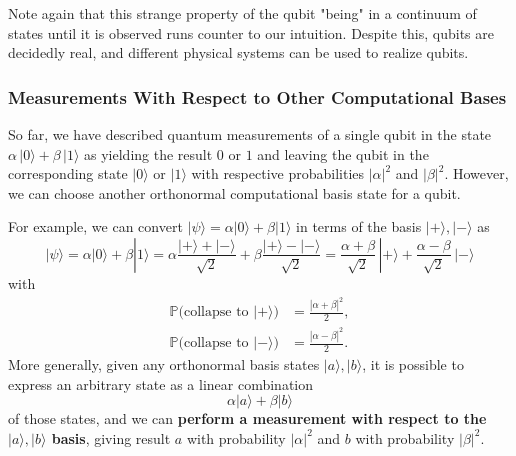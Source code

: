 \documentclass{article}
\theoremstyle{definition}
\begin{document}
Note again that this strange property of the qubit "being" in a continuum of states until it is observed runs counter to our intuition. Despite this, qubits are decidedly real, and different physical systems can be used to realize qubits.

\subsubsection*{Measurements With Respect to Other Computational Bases}

So far, we have described quantum measurements of a single qubit in the state $\alpha\, |0\rangle + \beta \, |1 \rangle$ as yielding the result $0$ or $1$ and leaving the qubit in the corresponding state $|0\rangle$ or $|1\rangle$ with respective probabilities $|\alpha|^2$ and $|\beta|^2$. However, we can choose another orthonormal computational basis state for a qubit.

For example, we can convert $|\psi \rangle = \alpha |0\rangle + \beta |1 \rangle$ in terms of the basis $|+\rangle, |-\rangle$ as
\[|\psi \rangle = \alpha |0\rangle + \beta |1 \rangle = \alpha \frac{|+\rangle + |-\rangle}{\sqrt{2}} + \beta \frac{|+\rangle - |-\rangle}{\sqrt{2}} = \frac{\alpha + \beta}{\sqrt{2}} \, |+\rangle + \frac{\alpha - \beta}{\sqrt{2}} \, |-\rangle\]
with
\begin{align*}
  \mathbb{P} \big( \text{collapse to } |+\rangle \big) & = \frac{|\alpha + \beta|^2}{2}, \\
  \mathbb{P} \big( \text{collapse to } |-\rangle \big) & = \frac{|\alpha - \beta|^2}{2}.
\end{align*}
More generally, given any orthonormal basis states $|a \rangle, |b \rangle$, it is possible to express an arbitrary state as a linear combination
\[ \alpha |a \rangle + \beta |b \rangle \]
of those states, and we can \textbf{perform a measurement with respect to the $|a\rangle, |b\rangle$ basis}, giving result $a$ with probability $|\alpha|^2$ and $b$ with probability $|\beta|^2$.
\end{document}
